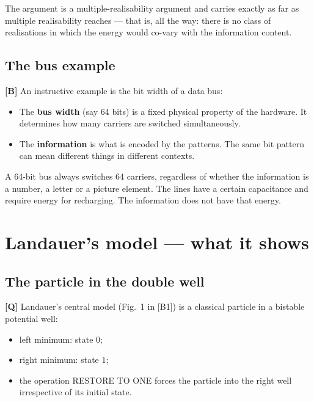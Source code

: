 The argument is a multiple-realisability argument and carries exactly as far as
multiple realisability reaches --- that is, all the way: there is no class of
realisations in which the energy would co-vary with the information content.

\subsection{The bus example}

\textbf{[B]} An instructive example is the bit width of a data bus:

\begin{itemize}[leftmargin=1.4em,itemsep=0.25em]
  \item The \textbf{bus width} (say 64 bits) is a fixed physical property of the
        hardware. It determines how many carriers are switched simultaneously.
  \item The \textbf{information} is what is encoded by the patterns. The same bit
        pattern can mean different things in different contexts.
\end{itemize}

A 64-bit bus always switches 64 carriers, regardless of whether the information is
a number, a letter or a picture element. The lines have a certain capacitance and
require energy for recharging. The information does not have that energy.

\section{Landauer's model --- what it shows}

\subsection{The particle in the double well}

\textbf{[Q]} Landauer's central model (Fig.~1 in [B1]) is a classical particle in a
bistable potential well:

\begin{itemize}[leftmargin=1.4em,itemsep=0.2em]
  \item left minimum: state $0$;
  \item right minimum: state $1$;
  \item the operation \textup{RESTORE TO ONE} forces the particle into the right
        well irrespective of its initial state.
\end{itemize}


